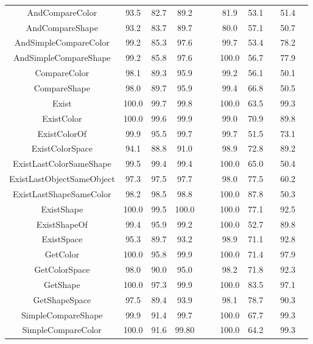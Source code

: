 \begin{table}[t]
\begin{tabular}{ccccccccccc}
		
		AndCompareColor	&	93.5		&	82.7	&	89.2	&&		&81.9	&53.1&&	51.4
\\ 
		AndCompareShape	&	93.2 		&	83.7	&	89.7	&&	&	80.0	&57.1	&&50.7\\ 
		AndSimpleCompareColor	&	99.2	&		85.3	&	97.6	&	&	&99.7&	53.4&&	78.2\\ 
		AndSimpleCompareShape	&	99.2&			85.8	&	97.6	&&	&	100.0	&56.7&&	77.9\\ 
		CompareColor	&	98.1		&	89.3	&	95.9	&&		&99.2&	56.1&&	50.1\\ 
		CompareShape	&	98.0	&		89.7	&	95.9	&&	&99.4	&66.8	&&50.5
\\ 
		Exist	&	100.0	&		99.7	&	99.8		&&	&	100.0&	63.5&&	99.3\\ 
		ExistColor	&	100.0		&	99.6	&	99.9	&&	&	99.0&	70.9&&	89.8\\ 
		ExistColorOf	&	99.9	&		95.5	&	99.7		& & &	99.7&	51.5&&	73.1\\ 
		ExistColorSpace	&94.1		&	88.8	&	91.0	&& &	98.9	&72.8	&&89.2\\ 
		ExistLastColorSameShape	&	99.5		&	99.4	&99.4	&&		&100.0	&65.0&&	50.4
\\ 
		ExistLastObjectSameObject	&	97.3	&		97.5	&	97.7	&&	&	98.0&	77.5	&&60.2\\ 
		ExistLastShapeSameColor	&	98.2		&	98.5&	98.8	&&	&	100.0&	87.8&&	50.3\\ 
		ExistShape	&	100.0	&	99.5	&	100.0	&&&	100.0&	77.1	&&92.5\\ 
		ExistShapeOf	&	99.4		&	95.9	&	99.2	&&&100.0	&52.7&&89.8\\ 
		ExistSpace	&	95.3	&	89.7	&	93.2	&&		&	98.9	&71.1	&&92.8\\ 
		GetColor	&	100.0		&	95.8&	99.9	&& &	100.0&	71.4&&	97.9\\ 
		GetColorSpace	&	98.0		&	90.0	&	95.0&	& &	98.2	&71.8&&	92.3\\ 
		GetShape	&	100.0		&	97.3&	99.9&	&	&	100.0  &83.5&&	97.1
\\ 
		GetShapeSpace	&	97.5	&	89.4	&	93.9	&&&	98.1  &78.7	&&	90.3\\ 
		SimpleCompareShape	&	99.9		&	91.4	&	99.7	&	&&	100.0 & 67.7&&	99.3\\ 
		SimpleCompareColor	&	100.0 		&	91.6  &	99.80&	&	&	100.0&	64.2&&	99.3	  \\ 
		
		
		
		
		
		
		
		\bottomrule
	\end{tabular}
	\label{results}
\end{table}



